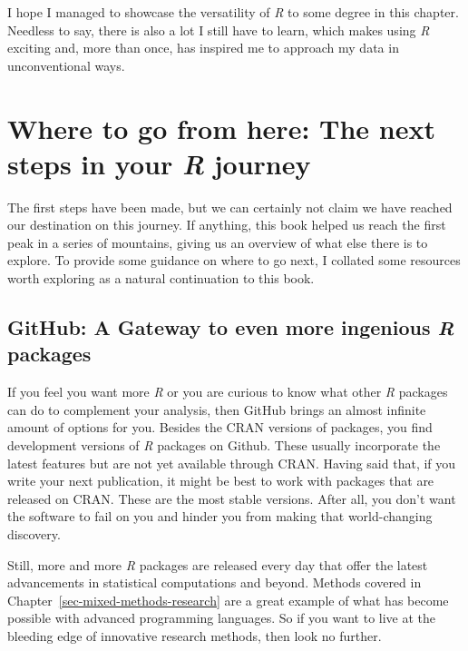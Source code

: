 \documentclass[
  letterpaper,
]{krantz}
\begin{document}
I hope I managed to showcase the versatility of \emph{R} to some degree
in this chapter. Needless to say, there is also a lot I still have to
learn, which makes using \emph{R} exciting and, more than once, has
inspired me to approach my data in unconventional ways.


\chapter{\texorpdfstring{Where to go from here: The next steps in your
\emph{R}
journey}{Where to go from here: The next steps in your R journey}}\label{sec-next-steps}

The first steps have been made, but we can certainly not claim we have
reached our destination on this journey. If anything, this book helped
us reach the first peak in a series of mountains, giving us an overview
of what else there is to explore. To provide some guidance on where to
go next, I collated some resources worth exploring as a natural
continuation to this book.

\section{\texorpdfstring{GitHub: A Gateway to even more ingenious
\emph{R}
packages}{GitHub: A Gateway to even more ingenious R packages}}\label{sec-next-steps-github}

If you feel you want more \emph{R} or you are curious to know what other
\emph{R} packages can do to complement your analysis, then GitHub brings
an almost infinite amount of options for you. Besides the CRAN versions
of packages, you find development versions of \emph{R} packages on
Github. These usually incorporate the latest features but are not yet
available through CRAN. Having said that, if you write your next
publication, it might be best to work with packages that are released on
CRAN. These are the most stable versions. After all, you don't want the
software to fail on you and hinder you from making that world-changing
discovery.

Still, more and more \emph{R} packages are released every day that offer
the latest advancements in statistical computations and beyond. Methods
covered in Chapter~\ref{sec-mixed-methods-research} are a great example
of what has become possible with advanced programming languages. So if
you want to live at the bleeding edge of innovative research methods,
then look no further.
\end{document}
